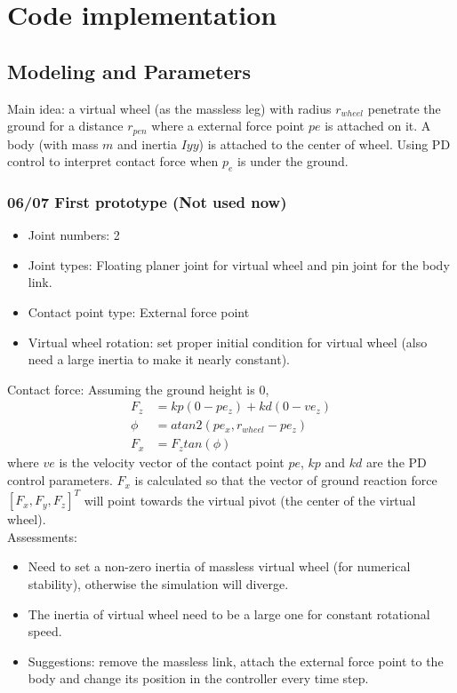 \section{Code implementation}





\subsection{Modeling and Parameters}
Main idea: a virtual wheel (as the massless leg) with radius $r_{wheel}$ penetrate the ground for a distance $r_{pen}$ where a external force point $pe$ is attached on it. A body (with mass $m$ and inertia $Iyy$) is attached to the center of wheel. 
Using PD control to interpret contact force when $p_e$ is under the ground.

\subsubsection*{06/07 First prototype (Not used now)}
\begin{itemize}
\item Joint numbers: 2
\item Joint types: Floating planer joint for virtual wheel and pin joint for the body link.
\item Contact point type: External force point
\item Virtual wheel rotation: set proper initial condition for virtual wheel (also need a large inertia to make it nearly constant).
\end{itemize}

Contact force: Assuming the ground height is $0$,
\begin{align}
F_z &= kp(0-pe_z) + kd(0 - ve_z)\\
\phi &= atan2(pe_x,r_{wheel}-pe_z)\\
F_x &= F_ztan(\phi)
\end{align}
where $ve$ is the velocity vector of the contact point $pe$, $kp$ and $kd$ are the PD control parameters. $F_x$ is calculated so that the vector of ground reaction force $[F_x,F_y,F_z]^T$ will point towards the virtual pivot (the center of the virtual wheel).\\

Assessments:
\begin{itemize}
\item Need to set a non-zero inertia of massless virtual wheel (for numerical stability), otherwise the simulation will diverge.
\item The inertia of virtual wheel need to be a large one for constant rotational speed.
\item Suggestions: remove the massless link, attach the external force point to the body and change its position in the controller every time step.
\end{itemize}

